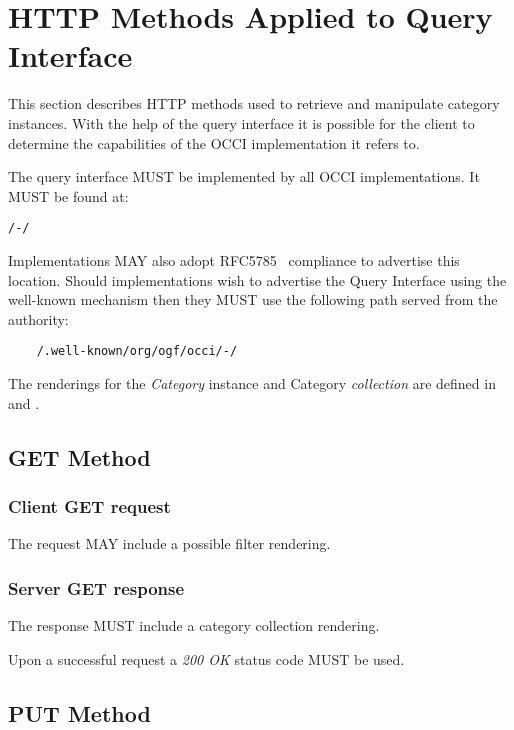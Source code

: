 \documentclass[10pt,a4paper]{article}
\begin{document}
\section{HTTP Methods Applied to Query Interface}
\label{sec:http_methods_qi}

This section describes HTTP methods used to retrieve and manipulate category instances.  With the help of the query interface it is possible for the client to determine the capabilities of the OCCI implementation it refers to.

The query interface MUST be implemented by all OCCI implementations. It MUST be found at:

\begin{verbatim}
/-/
\end{verbatim}

Implementations MAY also adopt RFC5785~\cite{rfc5785} compliance to advertise this location. Should implementations wish to advertise the Query Interface using the well-known mechanism then they MUST use the following path served from the authority:

\begin{verbatim}
    /.well-known/org/ogf/occi/-/
\end{verbatim}

The renderings for the {\em Category} instance and Category {\em collection} are defined in \cite{occi:text} and \cite{occi:json}.

\subsection{GET Method}

\subsubsection*{Client GET request}
The request MAY include a possible filter rendering.

\subsubsection*{Server GET response}
The response MUST include a category collection rendering.

Upon a successful request a \emph{200 OK} status code MUST be used.

\subsection{PUT Method}
\end{document}
